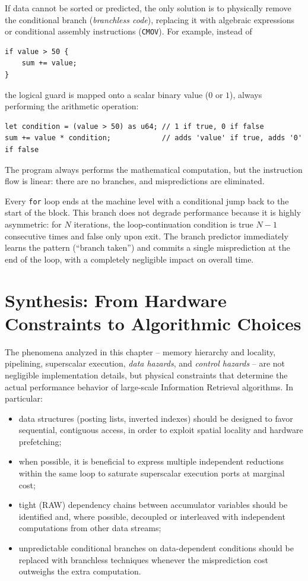 If data cannot be sorted or predicted, the only solution is to physically remove the conditional branch (\textit{branchless code}), replacing it with algebraic expressions or conditional assembly instructions (\texttt{CMOV}). For example, instead of
\begin{lstlisting}[style=rustcode]
if value > 50 {
    sum += value;
}
\end{lstlisting}
the logical guard is mapped onto a scalar binary value ($0$ or $1$), always performing the arithmetic operation:
\begin{lstlisting}[style=rustcode]
let condition = (value > 50) as u64; // 1 if true, 0 if false
sum += value * condition;            // adds 'value' if true, adds '0' if false
\end{lstlisting}
The program always performs the mathematical computation, but the instruction flow is linear: there are no branches, and mispredictions are eliminated.

\begin{remark}
Every \texttt{for} loop ends at the machine level with a conditional jump back to the start of the block. This branch does not degrade performance because it is highly asymmetric: for $N$ iterations, the loop-continuation condition is true $N-1$ consecutive times and false only upon exit. The branch predictor immediately learns the pattern (``branch taken'') and commits a single misprediction at the end of the loop, with a completely negligible impact on overall time.
\end{remark}

\FloatBarrier
\section{Synthesis: From Hardware Constraints to Algorithmic Choices}

The phenomena analyzed in this chapter -- memory hierarchy and locality, pipelining, superscalar execution, \textit{data hazards}, and \textit{control hazards} -- are not negligible implementation details, but physical constraints that determine the actual performance behavior of large-scale Information Retrieval algorithms. In particular:

\begin{itemize}
    \item data structures (posting lists, inverted indexes) should be designed to favor sequential, contiguous access, in order to exploit spatial locality and hardware prefetching;
    \item when possible, it is beneficial to express multiple independent reductions within the same loop to saturate superscalar execution ports at marginal cost;
    \item tight (RAW) dependency chains between accumulator variables should be identified and, where possible, decoupled or interleaved with independent computations from other data streams;
    \item unpredictable conditional branches on data-dependent conditions should be replaced with branchless techniques whenever the misprediction cost outweighs the extra computation.
\end{itemize}
